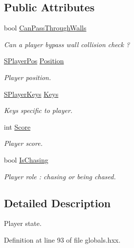 \subsection*{Public Attributes}
\begin{DoxyCompactItemize}
\item 
bool \hyperlink{struct_chase_game_1_1_s_player_state_acd7030969c414605901e551171078bb1}{Can\-Pass\-Through\-Walls}
\begin{DoxyCompactList}\small\item\em Can a player bypass wall collision check ? \end{DoxyCompactList}\item 
\hyperlink{struct_chase_game_1_1_s_player_pos}{S\-Player\-Pos} \hyperlink{struct_chase_game_1_1_s_player_state_a0a68b95a4255f2a543675f88b00847b4}{Position}
\begin{DoxyCompactList}\small\item\em Player position. \end{DoxyCompactList}\item 
\hyperlink{struct_chase_game_1_1_s_player_keys}{S\-Player\-Keys} \hyperlink{struct_chase_game_1_1_s_player_state_a3fc9ce0322ed28ff9c401983d91c69f2}{Keys}
\begin{DoxyCompactList}\small\item\em Keys specific to player. \end{DoxyCompactList}\item 
int \hyperlink{struct_chase_game_1_1_s_player_state_ac59e6b76a6e5303dbeef6a6b4fbca95d}{Score}
\begin{DoxyCompactList}\small\item\em Player score. \end{DoxyCompactList}\item 
bool \hyperlink{struct_chase_game_1_1_s_player_state_a2574de666d4744daefd7824b1c3c809f}{Is\-Chasing}
\begin{DoxyCompactList}\small\item\em Player role \-: chasing or being chased. \end{DoxyCompactList}\end{DoxyCompactItemize}


\subsection{Detailed Description}
Player state. 

Definition at line 93 of file globals.\-hxx.



